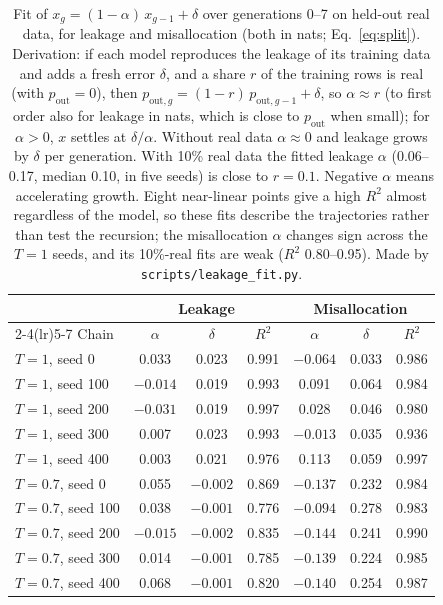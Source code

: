 \documentclass[10pt,letterpaper]{article}
\begin{document}
\begin{table}[H]
\centering
\caption{ Fit of $x_g = (1-\alpha)\,x_{g-1} + \delta$ over generations 0--7 on held-out real data, for leakage and misallocation (both in nats; Eq.~\ref{eq:split}). Derivation: if each model reproduces the leakage of its training data and adds a fresh error $\delta$, and a share $r$ of the training rows is real (with $p_\text{out}{=}0$), then $p_{\text{out},g} = (1-r)\,p_{\text{out},g-1} + \delta$, so $\alpha \approx r$ (to first order also for leakage in nats, which is close to $p_\text{out}$ when small); for $\alpha > 0$, $x$ settles at $\delta/\alpha$. Without real data $\alpha \approx 0$ and leakage grows by $\delta$ per generation. With 10\% real data the fitted leakage $\alpha$ (0.06--0.17, median 0.10, in five seeds) is close to $r{=}0.1$. Negative $\alpha$ means accelerating growth. Eight near-linear points give a high $R^2$ almost regardless of the model, so these fits describe the trajectories rather than test the recursion; the misallocation $\alpha$ changes sign across the $T{=}1$ seeds, and its 10\%-real fits are weak ($R^2$ 0.80--0.95). Made by \texttt{scripts/leakage\_fit.py}.}
\small
\begin{tabular}{@{}lcccccc@{}}
\toprule
& \multicolumn{3}{c}{Leakage} & \multicolumn{3}{c}{Misallocation} \\
\cmidrule(lr){2-4}\cmidrule(lr){5-7}
Chain & $\alpha$ & $\delta$ & $R^2$ & $\alpha$ & $\delta$ & $R^2$ \\
\midrule
$T{=}1$, seed 0 & 0.033 & 0.023 & 0.991 & $-0.064$ & 0.033 & 0.986 \\
$T{=}1$, seed 100 & $-0.014$ & 0.019 & 0.993 & 0.091 & 0.064 & 0.984 \\
$T{=}1$, seed 200 & $-0.031$ & 0.019 & 0.997 & 0.028 & 0.046 & 0.980 \\
$T{=}1$, seed 300 & 0.007 & 0.023 & 0.993 & $-0.013$ & 0.035 & 0.936 \\
$T{=}1$, seed 400 & 0.003 & 0.021 & 0.976 & 0.113 & 0.059 & 0.997 \\
\midrule
$T{=}0.7$, seed 0 & 0.055 & $-0.002$ & 0.869 & $-0.137$ & 0.232 & 0.984 \\
$T{=}0.7$, seed 100 & 0.038 & $-0.001$ & 0.776 & $-0.094$ & 0.278 & 0.983 \\
$T{=}0.7$, seed 200 & $-0.015$ & $-0.002$ & 0.835 & $-0.144$ & 0.241 & 0.990 \\
$T{=}0.7$, seed 300 & 0.014 & $-0.001$ & 0.785 & $-0.139$ & 0.224 & 0.985 \\
$T{=}0.7$, seed 400 & 0.068 & $-0.001$ & 0.820 & $-0.140$ & 0.254 & 0.987 \\

\end{tabular}
\end{table}
\end{document}
